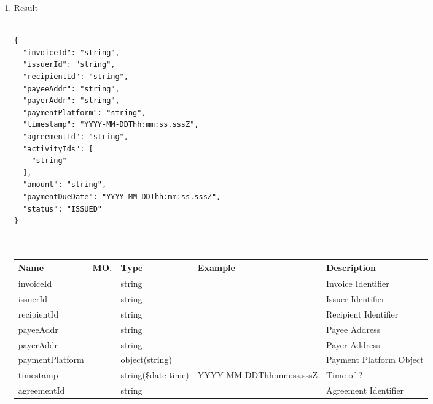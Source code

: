 \begin{enumerate}
\begin{table}[H]
\end{table}

\item Result

\begin{tcolorbox}[boxrule=0pt, frame empty]
\begin{verbatim}

{
  "invoiceId": "string",
  "issuerId": "string",
  "recipientId": "string",
  "payeeAddr": "string",
  "payerAddr": "string",
  "paymentPlatform": "string",
  "timestamp": "YYYY-MM-DDThh:mm:ss.sssZ",
  "agreementId": "string",
  "activityIds": [
    "string"
  ],
  "amount": "string",
  "paymentDueDate": "YYYY-MM-DDThh:mm:ss.sssZ",
  "status": "ISSUED"
}



\end{verbatim}
\end{tcolorbox}

\begin{table}[H]
\footnotesize

\begin{center}
\begin{tabular}{|p{3cm}|l|p{3cm}|p{3cm}|p{4cm}|} 
\hline
\rowcolor{lightgray}	Name	& MO.	& Type	& Example & 	Description \\
\hline

invoiceId				&	&	string				&																		&	Invoice Identifier \\
\hline   

issuerId				&	&	string				&																		&	Issuer Identifier \\
\hline   
  
recipientId				&	&	string				&																		&	Recipient Identifier \\
\hline   

payeeAddr				&	&	string				&																		&	Payee Address \\
\hline   
  
payerAddr				&	&	string				&																		&	Payer Address \\
\hline
   
paymentPlatform			&	&	object(string)		&																		&	Payment Platform Object \\
\hline

timestamp				&   &	string(\$date-time)	&	YYYY-MM-DDThh:mm:ss.sssZ											&	Time of ? \\
\hline

agreementId				& 	& 	string				&																		&	Agreement Identifier \\ 
\hline


\end{tabular}
\end{center}
\end{table}
\end{enumerate}
